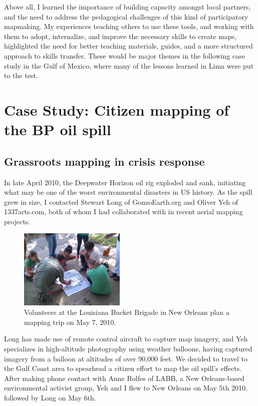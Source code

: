 \documentclass[11pt,oneside,notitlepage]{report}
\begin{document}
{{Above all, I learned the importance of building capacity amongst local partners, and the need to address the pedagogical challenges of this kind of participatory mapmaking. My experiences teaching others to use these tools, and working with them to adopt, internalize, and improve the necessary skills to create maps, highlighted the need for better teaching materials, guides, and a more structured approach to skills transfer. These would be major themes in the following case study in the Gulf of Mexico, where many of the lessons learned in Lima were put to the test. 

\chapter{Case Study: Citizen mapping of the BP oil spill}
\label{chap:gulf}

\section{Grassroots mapping in crisis response}

In late April 2010, the Deepwater Horizon oil rig exploded and sank, initiating what may be one of the worst environmental disasters in US history. \cite{campbell2010oil} As the spill grew in size, I contacted Stewart Long of GonzoEarth.org and Oliver Yeh of 1337arts.com, both of whom I had collaborated with in recent aerial mapping projects. \begin{figure}
	\begin{flushright}
		\includegraphics[width=0.45\textwidth]{images/labb-planning.jpg}
		\caption{Volunteers at the Louisiana Bucket Brigade in New Orleans plan a mapping trip on May 7, 2010.}
	\end{flushright}
\end{figure}Long has made use of remote control aircraft to capture map imagery, and Yeh specializes in high-altitude photography using weather balloons, having captured imagery from a balloon at altitudes of over 90,000 feet. We decided to travel to the Gulf Coast area to spearhead a citizen effort to map the oil spill's effects. After making phone contact with Anne Rolfes of \ac{LABB}, a New Orleans-based environmental activist group, Yeh and I flew to New Orleans on May 5th 2010, followed by Long on May 6th. 

}}
\end{document}
